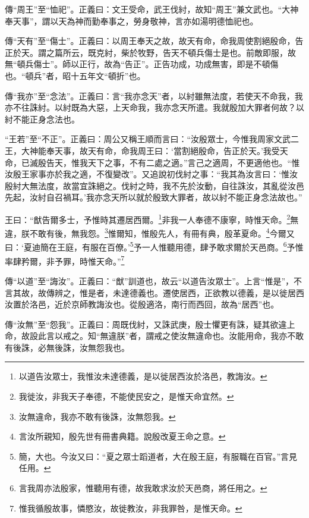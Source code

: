 {\noindent\zhuan{}\fzbyks 傳“周王”至“恤祀”。正義曰：文王受命，武王伐紂，故知“周王”兼文武也。“大神奉天事”，謂以天為神而勤奉事之，勞身敬神，言亦如湯明德恤祀也。 \par}

{\noindent\zhuan{}\fzbyks 傳“天有”至“傷士”。正義曰：以周王奉天之故，故天有命，命我周使割絕殷命，告正於天。謂之篇所云，既克紂，柴於牧野，告天不頓兵傷士是也。前敵即服，故無“頓兵傷士”。師以正行，故為“告正”。正告功成，功成無害，即是不頓傷也。“頓兵”者，昭十五年文“頓折”也。 \par}

{\noindent\zhuan{}\fzbyks 傳“我亦”至“念法”。正義曰：言“我亦念天”者，以紂雖無法度，若使天不命我，我亦不往誅紂。以紂既為大惡，上天命我，我亦念天所遣。我就殷加大罪者何故？以紂不能正身念法也。 \par}

{\noindent\shu{}\fzkt “王若”至“不正”。正義曰：周公又稱王順而言曰：“汝殷眾士，今惟我周家文武二王，大神能奉天事，故天有命，命我周王曰：‘當割絕殷命，告正於天。’我受天命，已滅殷告天，惟我天下之事，不有二處之適。”言己之適周，不更適他也。“惟汝殷王家事亦於我之適，不復變改”。又追說初伐紂之事：“我其為汝言曰：‘惟汝殷紂大無法度，故當宜誅絕之。伐紂之時，我不先於汝動，自往誅汝，其亂從汝邑先起，汝紂自召禍耳。’我亦念天所以就於殷致大罪者，故以紂不能正身念法故也。” \par}

王曰：“猷告爾多士，予惟時其遷居西爾。\footnote{以道告汝眾士，我惟汝未達德義，是以徙居西汝於洛邑，教誨汝。}非我一人奉德不康寧，時惟天命。\footnote{我徙汝，非我天子奉德，不能使民安之，是惟天命宜然。}無違，朕不敢有後，無我怨。\footnote{汝無違命，我亦不敢有後誅，汝無怨我。}惟爾知，惟殷先人，有冊有典，殷革夏命。\footnote{言汝所親知，殷先世有冊書典籍。說殷改夏王命之意。}今爾又曰：‘夏迪簡在王庭，有服在百僚。’\footnote{簡，大也。今汝又曰：“夏之眾士蹈道者，大在殷王庭，有服職在百官。”言見任用。}予一人惟聽用德，肆予敢求爾於天邑商。\footnote{言我周亦法殷家，惟聽用有德，故我敢求汝於天邑商，將任用之。}予惟率肆矜爾，非予罪，時惟天命。”\footnote{惟我循殷故事，憐愍汝，故徙教汝，非我罪咎，是惟天命。}

{\noindent\zhuan{}\fzbyks 傳“以道”至“誨汝”。正義曰：“猷”訓道也，故云“以道告汝眾士”。上言“惟是”，不言其故，故傳辨之，惟是者，未達德義也。遷使居西，正欲教以德義，是以徙居西汝置於洛邑，近於京師教誨汝也。從殷適洛，南行而西回，故為“居西”也。 \par}

{\noindent\zhuan{}\fzbyks 傳“汝無”至“怨我”。正義曰：周既伐紂，又誅武庚，殷士懼更有誅，疑其欲違上命，故設此言以戒之。知“無違朕”者，謂戒之使汝無違命也。汝能用命，我亦不敢有後誅，必無後誅，汝無怨我也。 \par}

